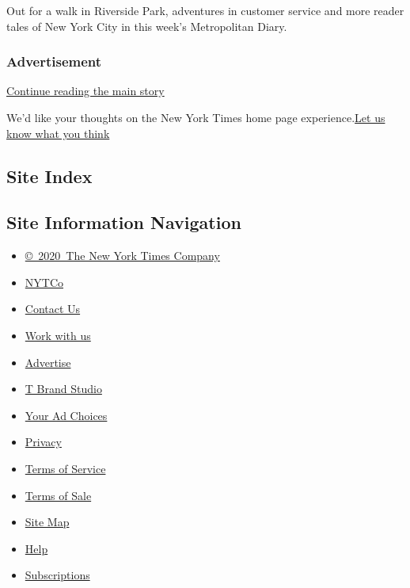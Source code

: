 Out for a walk in Riverside Park, adventures in customer service and
more reader tales of New York City in this week's Metropolitan Diary.

\href{/2020/08/16/nyregion/metropolitan-diary.html}{}

\hypertarget{advertisement}{%
\subsubsection{Advertisement}\label{advertisement}}

\protect\hyperlink{after-dfp-ad-mid1-large}{Continue reading the main
story}

We'd like your thoughts on the New York Times home page
experience.\href{http://nyt.qualtrics.com/jfe/form/SV_eFJmKj9v0krSE0l}{Let
us know what you think}

\hypertarget{site-index}{%
\subsection{Site Index}\label{site-index}}

\hypertarget{site-information-navigation}{%
\subsection{Site Information
Navigation}\label{site-information-navigation}}

\begin{itemize}
\tightlist
\item
  \href{https://help.nytimes3xbfgragh.onion/hc/en-us/articles/115014792127-Copyright-notice}{©~2020~The
  New York Times Company}
\end{itemize}

\begin{itemize}
\tightlist
\item
  \href{https://www.nytco.com/}{NYTCo}
\item
  \href{https://help.nytimes3xbfgragh.onion/hc/en-us/articles/115015385887-Contact-Us}{Contact
  Us}
\item
  \href{https://www.nytco.com/careers/}{Work with us}
\item
  \href{https://nytmediakit.com/}{Advertise}
\item
  \href{http://www.tbrandstudio.com/}{T Brand Studio}
\item
  \href{https://www.nytimes3xbfgragh.onion/privacy/cookie-policy\#how-do-i-manage-trackers}{Your
  Ad Choices}
\item
  \href{https://www.nytimes3xbfgragh.onion/privacy}{Privacy}
\item
  \href{https://help.nytimes3xbfgragh.onion/hc/en-us/articles/115014893428-Terms-of-service}{Terms
  of Service}
\item
  \href{https://help.nytimes3xbfgragh.onion/hc/en-us/articles/115014893968-Terms-of-sale}{Terms
  of Sale}
\item
  \href{https://spiderbites.nytimes3xbfgragh.onion}{Site Map}
\item
  \href{https://help.nytimes3xbfgragh.onion/hc/en-us}{Help}
\item
  \href{https://www.nytimes3xbfgragh.onion/subscription?campaignId=37WXW}{Subscriptions}
\end{itemize}
